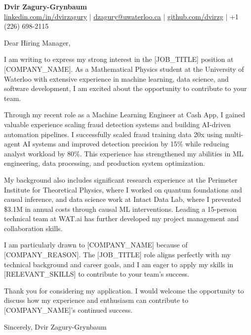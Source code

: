 \documentclass[letterpaper,11pt]{article}
\begin{document}
\begin{center}
    \textbf{\Huge Dvir Zagury-Grynbaum} \\ \vspace{1pt}
    \small \href{https://www.linkedin.com/in/dvirzagury/}{\underline{linkedin.com/in/dvirzagury}} $|$  \href{mailto:dzagury@uwaterloo.ca}{\underline{dzagury@uwaterloo.ca}} $|$
    \href{https://github.com/dvirzg}{\underline{github.com/dvirzg}} $|$ +1 (226) 698-2115
\end{center}

\vspace{1em}

Dear Hiring Manager,

I am writing to express my strong interest in the [JOB_TITLE] position at [COMPANY_NAME]. As a Mathematical Physics student at the University of Waterloo with extensive experience in machine learning, data science, and software development, I am excited about the opportunity to contribute to your team.

Through my recent role as a Machine Learning Engineer at Cash App, I gained valuable experience scaling fraud detection systems and building AI-driven automation pipelines. I successfully scaled fraud training data 20x using multi-agent AI systems and improved detection precision by 15\% while reducing analyst workload by 80\%. This experience has strengthened my abilities in ML engineering, data processing, and production system optimization.

My background also includes significant research experience at the Perimeter Institute for Theoretical Physics, where I worked on quantum foundations and causal inference, and data science work at Intact Data Lab, where I prevented \$3.1M in annual costs through causal ML interventions. Leading a 15-person technical team at WAT.ai has further developed my project management and collaboration skills.

I am particularly drawn to [COMPANY_NAME] because of [COMPANY_REASON]. The [JOB_TITLE] role aligns perfectly with my technical background and career goals, and I am eager to apply my skills in [RELEVANT_SKILLS] to contribute to your team's success.

Thank you for considering my application. I would welcome the opportunity to discuss how my experience and enthusiasm can contribute to [COMPANY_NAME]'s continued success.

Sincerely,
Dvir Zagury-Grynbaum
\end{document}
